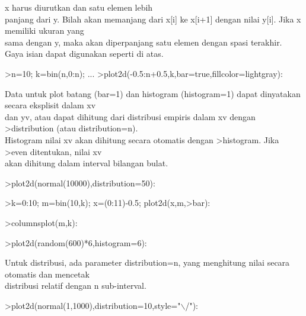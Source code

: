 \documentclass[a4paper,10pt]{article}
\begin{document}
\begin{eulernotebook}
\begin{eulercomment}
\begin{eulercomment}
\begin{eulercomment}
\begin{eulercomment}
\begin{eulercomment}
\begin{eulercomment}
\begin{eulercomment}
x harus diurutkan dan satu elemen lebih\\
panjang dari y. Bilah akan memanjang dari x[i] ke x[i+1] dengan nilai
y[i]. Jika x memiliki ukuran yang\\
sama dengan y, maka akan diperpanjang satu elemen dengan spasi
terakhir.\\
Gaya isian dapat digunakan seperti di atas.
\end{eulercomment}
\begin{eulerprompt}
>n=10; k=bin(n,0:n); ...
>plot2d(-0.5:n+0.5,k,bar=true,fillcolor=lightgray):
\end{eulerprompt}
\begin{eulercomment}
Data untuk plot batang (bar=1) dan histogram (histogram=1) dapat
dinyatakan secara eksplisit dalam xv\\
dan yv, atau dapat dihitung dari distribusi empiris dalam xv dengan
\textgreater{}distribution (atau distribution=n).\\
Histogram nilai xv akan dihitung secara otomatis dengan \textgreater{}histogram.
Jika \textgreater{}even ditentukan, nilai xv\\
akan dihitung dalam interval bilangan bulat.
\end{eulercomment}
\begin{eulerprompt}
>plot2d(normal(10000),distribution=50):
\end{eulerprompt}
\begin{eulerprompt}
>k=0:10; m=bin(10,k); x=(0:11)-0.5; plot2d(x,m,>bar):
\end{eulerprompt}
\begin{eulerprompt}
>columnsplot(m,k):
\end{eulerprompt}
\begin{eulerprompt}
>plot2d(random(600)*6,histogram=6):
\end{eulerprompt}
\begin{eulercomment}
Untuk distribusi, ada parameter distribution=n, yang menghitung nilai
secara otomatis dan mencetak\\
distribusi relatif dengan n sub-interval.
\end{eulercomment}
\begin{eulerprompt}
>plot2d(normal(1,1000),distribution=10,style="\(\backslash\)/"):
\end{eulerprompt}

\end{eulercomment}
\end{eulercomment}
\end{eulercomment}
\end{eulercomment}
\end{eulercomment}
\end{eulercomment}
\end{eulernotebook}
\end{document}

